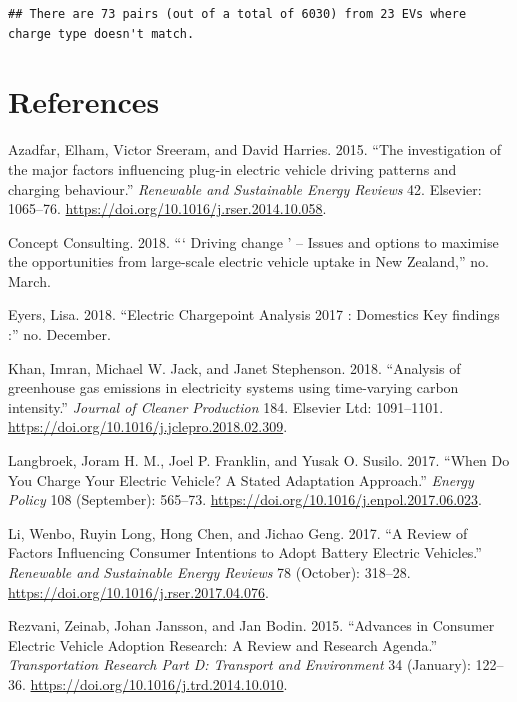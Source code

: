 \documentclass[]{article}
\begin{document}
\begin{verbatim}
## There are 73 pairs (out of a total of 6030) from 23 EVs where charge type doesn't match.
\end{verbatim}

\hypertarget{references}{%
\section*{References}\label{references}}

\hypertarget{refs}{}
\leavevmode\hypertarget{ref-Azadfar2015}{}%
Azadfar, Elham, Victor Sreeram, and David Harries. 2015. ``The investigation of the major factors influencing plug-in electric vehicle driving patterns and charging behaviour.'' \emph{Renewable and Sustainable Energy Reviews} 42. Elsevier: 1065--76. \url{https://doi.org/10.1016/j.rser.2014.10.058}.

\leavevmode\hypertarget{ref-ConceptConsulting2018}{}%
Concept Consulting. 2018. ``` Driving change ' -- Issues and options to maximise the opportunities from large-scale electric vehicle uptake in New Zealand,'' no. March.

\leavevmode\hypertarget{ref-Eyers2018}{}%
Eyers, Lisa. 2018. ``Electric Chargepoint Analysis 2017 : Domestics Key findings :'' no. December.

\leavevmode\hypertarget{ref-Khan2018}{}%
Khan, Imran, Michael W. Jack, and Janet Stephenson. 2018. ``Analysis of greenhouse gas emissions in electricity systems using time-varying carbon intensity.'' \emph{Journal of Cleaner Production} 184. Elsevier Ltd: 1091--1101. \url{https://doi.org/10.1016/j.jclepro.2018.02.309}.

\leavevmode\hypertarget{ref-langbroek_when_2017}{}%
Langbroek, Joram H. M., Joel P. Franklin, and Yusak O. Susilo. 2017. ``When Do You Charge Your Electric Vehicle? A Stated Adaptation Approach.'' \emph{Energy Policy} 108 (September): 565--73. \url{https://doi.org/10.1016/j.enpol.2017.06.023}.

\leavevmode\hypertarget{ref-li_review_2017}{}%
Li, Wenbo, Ruyin Long, Hong Chen, and Jichao Geng. 2017. ``A Review of Factors Influencing Consumer Intentions to Adopt Battery Electric Vehicles.'' \emph{Renewable and Sustainable Energy Reviews} 78 (October): 318--28. \url{https://doi.org/10.1016/j.rser.2017.04.076}.

\leavevmode\hypertarget{ref-rezvani_advances_2015}{}%
Rezvani, Zeinab, Johan Jansson, and Jan Bodin. 2015. ``Advances in Consumer Electric Vehicle Adoption Research: A Review and Research Agenda.'' \emph{Transportation Research Part D: Transport and Environment} 34 (January): 122--36. \url{https://doi.org/10.1016/j.trd.2014.10.010}.
\end{document}
